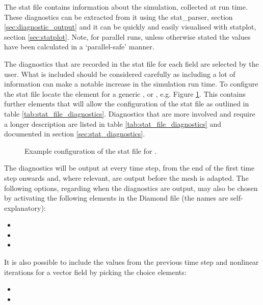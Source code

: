 The stat file contains information about the simulation, collected at run time. These diagnostics can be extracted from it using the stat\_parser, section \ref{sec:diagnostic_output} and it can be quickly and easily visualised with statplot, section \ref{sec:statplot}. Note, for parallel runs, unless otherwise stated the values have been calculated in a `parallel-safe' manner.

The diagnostics that are recorded in the stat file for each field are selected by the user.  What is included should be considered carefully as including a lot of information can make a notable increase in the simulation run time. To configure the stat file locate the  element for a generic ,  or , e.g. Figure \ref{fig:diamond_enable_stat}. This contains further elements that will allow the configuration of the stat file as outlined in table \ref{tab:stat_file_diagnostics}. Diagnostics that are more involved and require a longer description are listed in table \ref{tab:stat_file_diagnostics} and documented in section \ref{sec:stat_diagnostics}.

\begin{figure}[ht]
  \centering
  \caption{Example configuration of the stat file for .}
  \label{fig:diamond_enable_stat}
\end{figure}

The diagnostics will be output at every time step, from the end of the first time step onwards and, where relevant, are output before the mesh is adapted. The following options, regarding when the diagnostics are output, may also be chosen by activating the following elements in the Diamond file (the names are self-explanatory):
\begin{itemize}
\item {}
\item {}
\item {}
\end{itemize}

It is also possible to include the values from the previous time step and nonlinear iterations for a vector field by picking the choice elements:
\begin{itemize}
\item {}
\item {}
\end{itemize}

